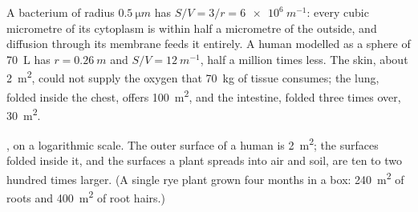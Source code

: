 \begin{example}\label{ex:b1:organism-environment:svnumbers}
A bacterium of radius $\qty{0.5}{\micro m}$ has
$S/V = 3/r = \qty{6e6}{m^{-1}}$: every cubic micrometre of its cytoplasm
is within half a micrometre of the outside, and diffusion through its
membrane feeds it entirely. A human modelled as a sphere of \qty{70}{L}
has $r = \qty{0.26}{m}$ and $S/V = \qty{12}{m^{-1}}$, half a million
times less. The skin, about \qty{2}{m^2}, could not supply the oxygen
that \qty{70}{kg} of tissue consumes; the lung, folded inside the chest,
offers \qty{100}{m^2}, and the intestine, folded three times over,
\qty{30}{m^2}.
\end{example}

\begin{omfigure}

{\small {}, on a logarithmic scale. The outer surface of
a human is \qty{2}{m^2}; the surfaces folded inside it, and the surfaces
a plant spreads into air and soil, are ten to two hundred times larger.
(A single rye plant grown four months in a box: \qty{240}{m^2} of roots
and \qty{400}{m^2} of root hairs.)}
\end{omfigure}

